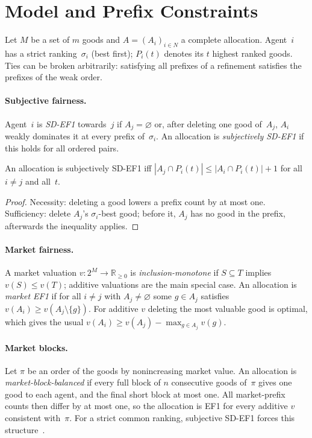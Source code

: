 \documentclass[sigconf,anonymous]{aamas}
\begin{document}
\section{Model and Prefix Constraints}\label{sec:model}
Let $M$ be a set of $m$ goods and $A=(A_i)_{i\in N}$ a complete allocation. Agent~$i$ has a strict ranking~$\sigma_i$ (best first); $P_i(t)$ denotes its $t$ highest ranked goods. Ties can be broken arbitrarily: satisfying all prefixes of a refinement satisfies the prefixes of the weak order.

\paragraph{Subjective fairness.} Agent~$i$ is \emph{SD-EF1} towards~$j$ if $A_j=\varnothing$ or, after deleting one good of~$A_j$, $A_i$ weakly dominates it at every prefix of~$\sigma_i$. An allocation is \emph{subjectively SD-EF1} if this holds for all ordered pairs.

\begin{lemma}\label{lem:prefix}
An allocation is subjectively SD-EF1 iff $|A_j\cap P_i(t)|\le |A_i\cap P_i(t)|+1$ for all $i\ne j$ and all~$t$.
\end{lemma}
\begin{proof}
Necessity: deleting a good lowers a prefix count by at most one. Sufficiency: delete $A_j$'s $\sigma_i$-best good; before it, $A_j$ has no good in the prefix, afterwards the inequality applies.
\end{proof}

\paragraph{Market fairness.} A market valuation $v:2^M\to\mathbb R_{\ge0}$ is \emph{inclusion-monotone} if $S\subseteq T$ implies $v(S)\le v(T)$; additive valuations are the main special case. An allocation is \emph{market EF1} if for all $i\ne j$ with $A_j\ne\varnothing$ some $g\in A_j$ satisfies $v(A_i)\ge v(A_j\setminus\{g\})$. For additive $v$ deleting the most valuable good is optimal, which gives the usual $v(A_i)\ge v(A_j)-\max_{g\in A_j}v(g)$.

\paragraph{Market blocks.} Let $\pi$ be an order of the goods by nonincreasing market value. An allocation is \emph{market-block-balanced} if every full block of $n$ consecutive goods of~$\pi$ gives one good to each agent, and the final short block at most one. All market-prefix counts then differ by at most one, so the allocation is EF1 for every additive $v$ consistent with~$\pi$. For a strict common ranking, subjective SD-EF1 forces this structure~\citep{barman2025market}.
\end{document}
